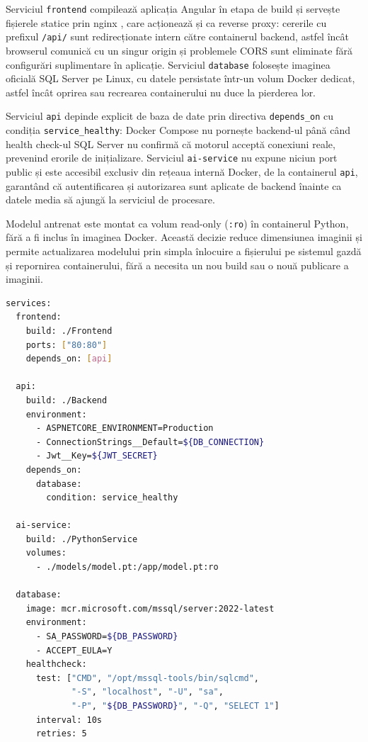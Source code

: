 Serviciul \texttt{frontend} compilează aplicația Angular în etapa de build și servește fișierele statice prin nginx \citep{nginx}, care acționează și ca reverse proxy: cererile cu prefixul \texttt{/api/} sunt redirecționate intern către containerul backend, astfel încât browserul comunică cu un singur origin și problemele CORS sunt eliminate fără configurări suplimentare în aplicație. Serviciul \texttt{database} folosește imaginea oficială SQL Server pe Linux, cu datele persistate într-un volum Docker dedicat, astfel încât oprirea sau recrearea containerului nu duce la pierderea lor.

Serviciul \texttt{api} depinde explicit de baza de date prin directiva \texttt{depends\_on} cu condiția \texttt{service\_healthy}: Docker Compose nu pornește backend-ul până când health check-ul SQL Server nu confirmă că motorul acceptă conexiuni reale, prevenind erorile de inițializare. Serviciul \texttt{ai-service} nu expune niciun port public și este accesibil exclusiv din rețeaua internă Docker, de la containerul \texttt{api}, garantând că autentificarea și autorizarea sunt aplicate de backend înainte ca datele media să ajungă la serviciul de procesare.

Modelul antrenat este montat ca volum read-only (\texttt{:ro}) în containerul Python, fără a fi inclus în imaginea Docker. Această decizie reduce dimensiunea imaginii și permite actualizarea modelului prin simpla înlocuire a fișierului pe sistemul gazdă și repornirea containerului, fără a necesita un nou build sau o nouă publicare a imaginii.

\begin{lstlisting}[language=bash, caption={Structura serviciilor în docker-compose.yml}]
services:
  frontend:
    build: ./Frontend
    ports: ["80:80"]
    depends_on: [api]

  api:
    build: ./Backend
    environment:
      - ASPNETCORE_ENVIRONMENT=Production
      - ConnectionStrings__Default=${DB_CONNECTION}
      - Jwt__Key=${JWT_SECRET}
    depends_on:
      database:
        condition: service_healthy

  ai-service:
    build: ./PythonService
    volumes:
      - ./models/model.pt:/app/model.pt:ro

  database:
    image: mcr.microsoft.com/mssql/server:2022-latest
    environment:
      - SA_PASSWORD=${DB_PASSWORD}
      - ACCEPT_EULA=Y
    healthcheck:
      test: ["CMD", "/opt/mssql-tools/bin/sqlcmd",
             "-S", "localhost", "-U", "sa",
             "-P", "${DB_PASSWORD}", "-Q", "SELECT 1"]
      interval: 10s
      retries: 5
\end{lstlisting}

